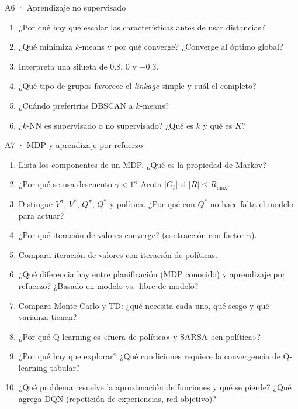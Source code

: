 \begin{ejercicio}{A6 · Aprendizaje no supervisado }
\begin{enumerate}[label=\arabic*.]
\item ¿Por qué hay que escalar las características antes de usar distancias?
\item ¿Qué minimiza $k$-means y por qué converge? ¿Converge al óptimo global?
\item Interpreta una silueta de $0.8$, $0$ y $-0.3$.
\item ¿Qué tipo de grupos favorece el \emph{linkage} simple y cuál el completo?
\item ¿Cuándo preferirías DBSCAN a $k$-means?
\item ¿$k$-NN es supervisado o no supervisado? ¿Qué es $k$ y qué es $K$?
\end{enumerate}
\end{ejercicio}

\begin{ejercicio}{A7 · MDP y aprendizaje por refuerzo }
\begin{enumerate}[label=\arabic*.]
\item Lista los componentes de un MDP. ¿Qué es la propiedad de Markov?
\item ¿Por qué se usa descuento $\gamma<1$? Acota $|G_t|$ si $|R|\le R_{\max}$.
\item Distingue $V^\pi$, $V^*$, $Q^\pi$, $Q^*$ y política. ¿Por qué con $Q^*$ no hace falta el modelo para actuar?
\item ¿Por qué iteración de valores converge? (contracción con factor $\gamma$).
\item Compara iteración de valores con iteración de políticas.
\item ¿Qué diferencia hay entre planificación (MDP conocido) y aprendizaje por refuerzo? ¿Basado en modelo vs.\ libre de modelo?
\item Compara Monte Carlo y TD: ¿qué necesita cada uno, qué sesgo y qué varianza tienen?
\item ¿Por qué Q-learning es «fuera de política» y SARSA «en política»?
\item ¿Por qué hay que explorar? ¿Qué condiciones requiere la convergencia de Q-learning tabular?
\item ¿Qué problema resuelve la aproximación de funciones y qué se pierde? ¿Qué agrega DQN (repetición de experiencias, red objetivo)?
\end{enumerate}
\end{ejercicio}

